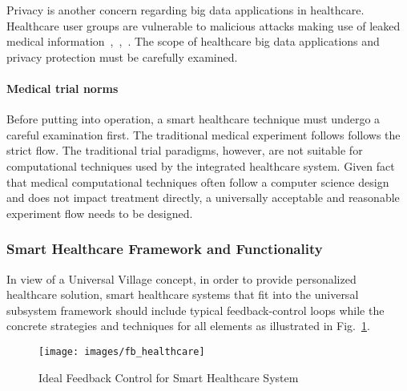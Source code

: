 \documentclass[letterpaper, twocolumn, 10pt, conference]{IEEEtran}
\begin{document}
Privacy is another concern regarding big data applications in healthcare. Healthcare user groups are vulnerable to malicious attacks making use of leaked medical information~\cite{hc_paper_8},~\cite{hc_paper_28},~\cite{hc_review_29}. The scope of healthcare big data applications and privacy protection must be carefully examined.


\paragraph{Medical trial norms}



Before putting into operation,  %
a smart healthcare technique must undergo a careful examination first. The traditional medical experiment follows follows the strict flow. 
The traditional trial paradigms, however, are not suitable for computational techniques used by the integrated healthcare system. Given fact that medical computational techniques often follow a computer science design and does not impact treatment directly, a universally acceptable and reasonable experiment flow needs to be designed.


\subsubsection{Smart Healthcare Framework and Functionality}
\label{sssec:cgh:smart_health:framework}


In view of a Universal Village concept, in order to provide personalized healthcare solution, smart healthcare systems that fit into the universal subsystem framework should include typical feedback-control loops while the concrete strategies and techniques for all elements as illustrated in Fig.~\ref{fig:cgh:smart_healthcare_feedback}. 

\begin{figure}[h!]
        \centering
        \texttt{[image: images/fb\_healthcare]}
        \caption{Ideal Feedback Control for Smart Healthcare System}
        \label{fig:cgh:smart_healthcare_feedback}
\end{figure}
\end{document}
